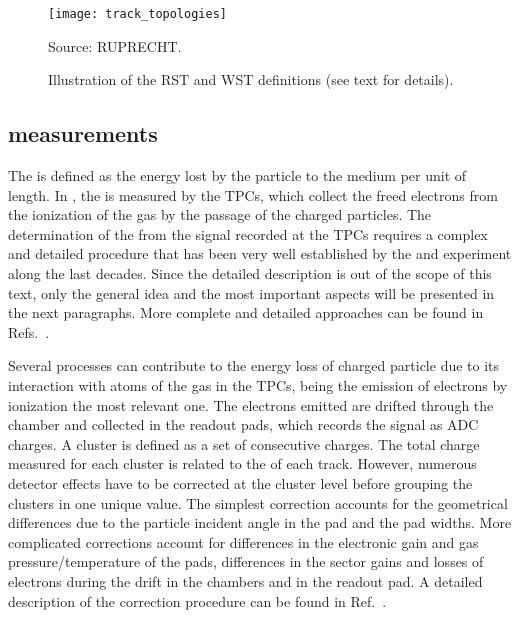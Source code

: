 \begin{figure}[!ht]
  \centering
  \texttt{[image: track\_topologies]}
  \caption{Illustration of the RST and WST definitions (see text for details).~\cite{MartinThesis}}
  \label{fig:hadron:track:topologies}
  \begin{center}
    \small Source: RUPRECHT.~\cite{MartinThesis} 
  \end{center}
\end{figure}

\subsection[\dedx measurements]{\boldmath \dedx measurements}
\label{sec:hadron:dedx:meas}

The \dedx is defined as the energy lost by the
particle to the medium per unit of length. 
In \NASixtyOne, the \dedx is measured by the TPCs, which collect the 
freed electrons from the ionization of the gas by the passage of the charged particles.
The determination of the \dedx from the signal recorded at the TPCs requires a complex and
detailed procedure that has been very well established by the \NAFortyNine and \NASixtyOne
experiment along the last decades. Since the detailed description 
is out of the scope of this text, only the general idea and the most important aspects
will be presented in the next paragraphs. More complete and detailed approaches
can be found in Refs.~\cite{BlumBook,LeeuwenThesis,GaborVeresThesis}.

Several processes can contribute to the energy loss of charged particle due to
its interaction with atoms of the gas in the TPCs, being the emission of
electrons by ionization the most relevant one. The electrons emitted are
drifted through the chamber and collected in the readout pads, which records
the signal as ADC charges. A cluster is defined as a set of consecutive charges.
The total charge measured for each cluster is related to the \dedx of each track.
However, numerous detector effects have to be corrected at the cluster level before
grouping the clusters in one unique \dedx value. The simplest correction accounts for
the geometrical differences due to the particle incident angle in the pad and
the pad widths. More complicated corrections account for differences in the electronic
gain and gas pressure/temperature of the pads, differences in the sector gains and
losses of electrons during the drift in the chambers and in the readout pad.
A detailed description of the correction procedure can be found in Ref.~\cite{AntoniMThesis}.

